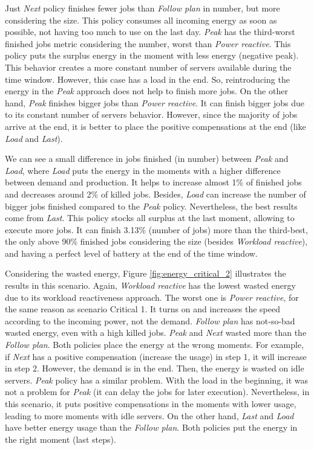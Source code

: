 Just \emph{Next} policy finishes fewer jobs than \emph{Follow plan} in number, but more considering the size. This policy consumes all incoming energy as soon as possible, not having too much to use on the last day. \emph{Peak} has the third-worst finished jobs metric considering the number, worst than \emph{Power reactive}. This policy puts the surplus energy in the moment with less energy (negative peak). This behavior creates a more constant number of servers available during the time window. However, this case has a load in the end. So, reintroducing the energy in the \emph{Peak} approach does not help to finish more jobs. On the other hand, \emph{Peak} finishes bigger jobs than \emph{Power reactive}. It can finish bigger jobs due to its constant number of servers behavior. However, since the majority of jobs arrive at the end, it is better to place the positive compensations at the end (like \emph{Load} and \emph{Last}).

We can see a small difference in jobs finished (in number) between \emph{Peak} and \emph{Load}, where \emph{Load} puts the energy in the moments with a higher difference between demand and production. It helps to increase almost 1\% of finished jobs and decreases around 2\% of killed jobs. Besides, \emph{Load} can increase the number of bigger jobs finished compared to the \emph{Peak} policy. Nevertheless, the best results come from \emph{Last}. This policy stocks all surplus at the last moment, allowing to execute more jobs. It can finish 3.13\% (number of jobs) more than the third-best, the only above 90\% finished jobs considering the size (besides \emph{Workload reactive}), and having a perfect level of battery at the end of the time window.

Considering the wasted energy, Figure \ref{fig:energy_critical_2} illustrates the results in this scenario. Again, \emph{Workload reactive} has the lowest wasted energy due to its workload reactiveness approach. The worst one is \emph{Power reactive}, for the same reason as scenario Critical 1. It turns on and increases the speed according to the incoming power, not the demand. \emph{Follow plan} has not-so-bad wasted energy, even with a high killed jobs. \emph{Peak} and \emph{Next} wasted more than the \emph{Follow plan}. Both policies place the energy at the wrong moments. For example, if \emph{Next} has a positive compensation (increase the usage) in step 1, it will increase in step 2. However, the demand is in the end. Then, the energy is wasted on idle servers. \emph{Peak} policy has a similar problem. With the load in the beginning, it was not a problem for \emph{Peak} (it can delay the jobs for later execution). Nevertheless, in this scenario, it puts positive compensations in the moments with lower usage, leading to more moments with idle servers. On the other hand, \emph{Last} and \emph{Load} have better energy usage than the \emph{Follow plan}. Both policies put the energy in the right moment (last steps).

